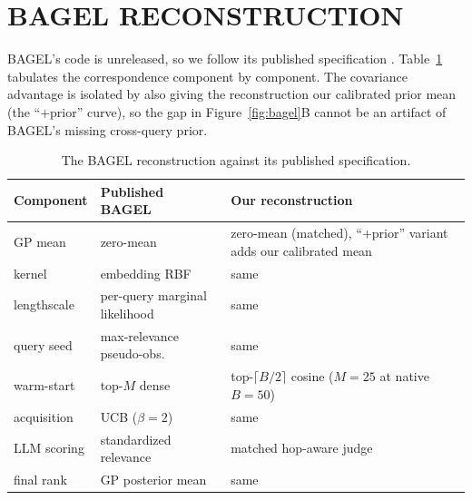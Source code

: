\documentclass[twoside]{article}
\theoremstyle{plain}
\theoremstyle{definition}
\begin{document}
\section{BAGEL RECONSTRUCTION}\label{app:bagel}
BAGEL's code is unreleased, so we follow its published specification \citep{bagel2026}. Table~\ref{tab:bagel-spec}
tabulates the correspondence component by component. The covariance advantage is isolated by also giving the
reconstruction our calibrated prior mean (the ``$+$prior'' curve), so the gap in Figure~\ref{fig:bagel}B cannot be
an artifact of BAGEL's missing cross-query prior.
\begin{table}[h]\caption{The BAGEL reconstruction against its published specification.}\label{tab:bagel-spec}
\begin{center}\small
\begin{tabular}{lll}
\toprule
Component & Published BAGEL & Our reconstruction \\ \midrule
GP mean & zero-mean & zero-mean (matched), ``$+$prior'' variant adds our calibrated mean \\
kernel & embedding RBF & same \\
lengthscale & per-query marginal likelihood & same \\
query seed & max-relevance pseudo-obs. & same \\
warm-start & top-$M$ dense & top-$\lceil B/2\rceil$ cosine ($M{=}25$ at native $B{=}50$) \\
acquisition & UCB ($\beta{=}2$) & same \\
LLM scoring & standardized relevance & matched hop-aware judge \\
final rank & GP posterior mean & same \\
\bottomrule
\end{tabular}
\end{center}
\end{table}
\end{document}
